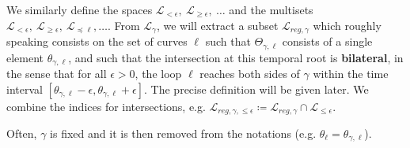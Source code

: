 \documentclass[11pt]{article}
\def\d{\,{\rm d}}
\def\R{{\mathbb R}}
\def\cL{{\mathcal L}}
\DeclareMathOperator{\Range}{Range}
\begin{document}
We similarly define the spaces $\mathscr{L}_{< \epsilon},\ \mathscr{L}_{\geq \epsilon},\ \dots$ and the multisets $\mathcal{L}_{<\epsilon },\ \mathcal{L}_{\geq \epsilon },\  \mathcal{L}_{\preceq \ell},\dots$.
From $ \mathscr{L}_{\gamma}$, we will extract a subset  $\mathscr{L}_{reg,\gamma}$ which roughly speaking consists on the set of curves $\ell$ such that $\Theta_{\gamma,\ell}$ consists of a single element $\theta_{\gamma,\ell}$, and such that the intersection at this temporal root is {\textbf{bilateral}}, in the sense that for all $\epsilon>0$, the loop $\ell$ reaches both sides of $\gamma$ within the time interval
$[\theta_{\gamma,\ell}-\epsilon,\theta_{\gamma,\ell}+\epsilon]$. The precise definition will be given later. We combine the indices for intersections, e.g. $\mathcal{L}_{reg,\gamma,\leq \epsilon}\coloneqq \mathcal{L}_{reg,\gamma}\cap \mathcal{L}_{\leq \epsilon}$.


Often, $\gamma$ is fixed and it is then removed from the notations (e.g. $\theta_\ell=\theta_{\gamma,\ell}$).




%
%
%
\end{document}
